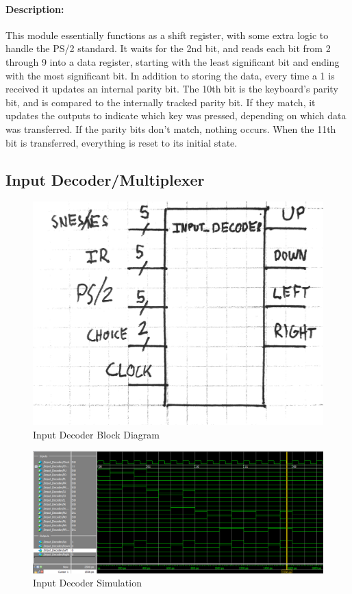 \documentclass[]{article}
\begin{document}
\paragraph{Description:} This module essentially functions as a shift register, with some extra logic to handle the PS/2 standard.  It waits for the 2nd bit, and reads each bit from 2 through 9 into a data register, starting with the least significant bit and ending with the most significant bit.  In addition to storing the data, every time a 1 is received it updates an internal parity bit.  The 10th bit is the keyboard's parity bit, and is compared to the internally tracked parity bit.  If they match, it updates the outputs to indicate which key was pressed, depending on which data was transferred.  If the parity bits don't match, nothing occurs.  When the 11th bit is transferred, everything is reset to its initial state.

\subsection{Input Decoder/Multiplexer}
\begin{figure}[H]\centering
    \includegraphics[width=0.5\linewidth]{figures/Input_Decoder_Block.jpg}
    \caption{Input Decoder Block Diagram}
    \label{fig:inputDecoderBlock}
\end{figure}
\begin{figure}[H]\centering
    \includegraphics[width=\linewidth]{figures/Input_Decoder_Sim.png}
    \caption{Input Decoder Simulation}
    \label{fig:inputDecoderSim}
\end{figure}
\end{document}
